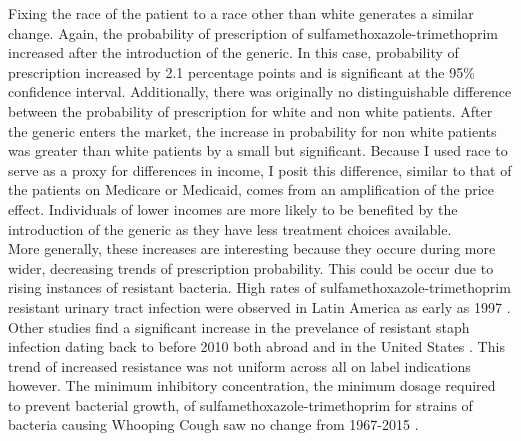 \indent Fixing the race of the patient to a race other than white generates a similar change. Again, the probability of prescription of sulfamethoxazole-trimethoprim increased after the introduction of the generic. In this case, probability of prescription increased by 2.1 percentage points and is significant at the 95\% confidence interval. Additionally, there was originally no distinguishable difference between the probability of prescription for white and non white patients. After the generic enters the market, the increase in probability for non white patients was greater than white patients by a small but significant. Because I used race to serve as a proxy for differences in income, I posit this difference, similar to that of the patients on Medicare or Medicaid, comes from an amplification of the price effect. Individuals of lower incomes are more likely to be benefited by the introduction of the generic as they have less treatment choices available.\\
\indent More generally, these increases are interesting because they occure during more wider, decreasing trends of prescription probability. This could be occur due to rising instances of resistant bacteria. High rates of sulfamethoxazole-trimethoprim resistant urinary tract infection were observed in Latin America as early as 1997 \cite{gales_urinary_2002}. Other studies find a significant increase in the prevelance of resistant staph infection dating back to before 2010 both abroad \cite{noauthor_resistance_nodate} and in the United States \cite{khamash_increasing_2019}. This trend of increased resistance was not uniform across all on label indications however. The minimum inhibitory concentration, the minimum dosage required to prevent bacterial growth, of sulfamethoxazole-trimethoprim for strains of bacteria causing Whooping Cough saw no change from 1967-2015 \cite{jakubu_trends_2017}.
